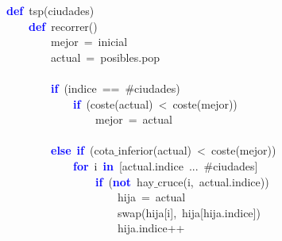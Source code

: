 \noindent
\mbox{}\textbf{\textcolor{Blue}{def}}\ tsp\textcolor{BrickRed}{(}ciudades\textcolor{BrickRed}{)} \\
\mbox{}\ \ \ \ \textbf{\textcolor{Blue}{def}}\ recorrer\textcolor{BrickRed}{()} \\
\mbox{}\ \ \ \ \ \ \ \ mejor\ \textcolor{BrickRed}{=}\ inicial \\
\mbox{}\ \ \ \ \ \ \ \ actual\ \textcolor{BrickRed}{=}\ posibles\textcolor{BrickRed}{.}pop \\
\mbox{} \\
\mbox{}\ \ \ \ \ \ \ \ \textbf{\textcolor{Blue}{if}}\ \textcolor{BrickRed}{(}indice\ \textcolor{BrickRed}{==}\ \#ciudades\textcolor{BrickRed}{)} \\
\mbox{}\ \ \ \ \ \ \ \ \ \ \ \ \textbf{\textcolor{Blue}{if}}\ \textcolor{BrickRed}{(}coste\textcolor{BrickRed}{(}actual\textcolor{BrickRed}{)}\ \textcolor{BrickRed}{\textless{}}\ coste\textcolor{BrickRed}{(}mejor\textcolor{BrickRed}{))} \\
\mbox{}\ \ \ \ \ \ \ \ \ \ \ \ \ \ \ \ mejor\ \textcolor{BrickRed}{=}\ actual \\
\mbox{} \\
\mbox{}\ \ \ \ \ \ \ \ \textbf{\textcolor{Blue}{else}}\ \textbf{\textcolor{Blue}{if}}\ \textcolor{BrickRed}{(}cota$\_$inferior\textcolor{BrickRed}{(}actual\textcolor{BrickRed}{)}\ \textcolor{BrickRed}{\textless{}}\ coste\textcolor{BrickRed}{(}mejor\textcolor{BrickRed}{))} \\
\mbox{}\ \ \ \ \ \ \ \ \ \ \ \ \textbf{\textcolor{Blue}{for}}\ i\ \textbf{\textcolor{Blue}{in}}\ \textcolor{BrickRed}{[}actual\textcolor{BrickRed}{.}indice\ \textcolor{BrickRed}{...}\ \#ciudades\textcolor{BrickRed}{]} \\
\mbox{}\ \ \ \ \ \ \ \ \ \ \ \ \ \ \ \ \textbf{\textcolor{Blue}{if}}\ \textcolor{BrickRed}{(}\textbf{\textcolor{Blue}{not}}\ hay$\_$cruce\textcolor{BrickRed}{(}i\textcolor{BrickRed}{,}\ actual\textcolor{BrickRed}{.}indice\textcolor{BrickRed}{))} \\
\mbox{}\ \ \ \ \ \ \ \ \ \ \ \ \ \ \ \ \ \ \ \ hija\ \textcolor{BrickRed}{=}\ actual \\
\mbox{}\ \ \ \ \ \ \ \ \ \ \ \ \ \ \ \ \ \ \ \ swap\textcolor{BrickRed}{(}hija\textcolor{BrickRed}{[}i\textcolor{BrickRed}{],}\ hija\textcolor{BrickRed}{[}hija\textcolor{BrickRed}{.}indice\textcolor{BrickRed}{])} \\
\mbox{}\ \ \ \ \ \ \ \ \ \ \ \ \ \ \ \ \ \ \ \ hija\textcolor{BrickRed}{.}indice\textcolor{BrickRed}{++} \\
